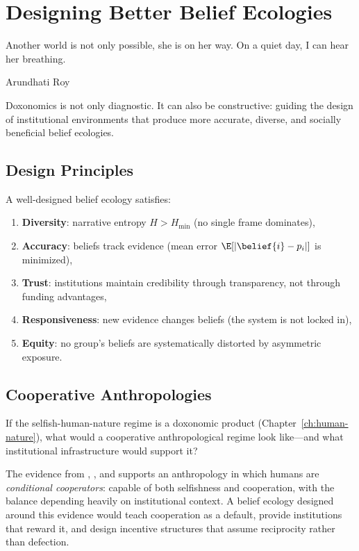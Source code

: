 \chapter{Designing Better Belief Ecologies}
\label{ch:better-belief-ecologies}

\epigraph{Another world is not only possible, she is on her way. On a quiet day, I can hear her breathing.}{Arundhati Roy}

\noindent
Doxonomics is not only diagnostic.
It can also be constructive: guiding the design of institutional environments that produce more accurate, diverse, and socially beneficial belief ecologies.

\section{Design Principles}
\label{sec:ch33-principles}

\begin{principle}
\label{prin:ecology-design}
A well-designed belief ecology satisfies:
\begin{enumerate}[nosep]
  \item \textbf{Diversity}: narrative entropy $H > H_{\min}$ (no single frame dominates),
  \item \textbf{Accuracy}: beliefs track evidence (mean error $\E[|\belief{i} - p_i|]$ is minimized),
  \item \textbf{Trust}: institutions maintain credibility through transparency, not through funding advantages,
  \item \textbf{Responsiveness}: new evidence changes beliefs (the system is not locked in),
  \item \textbf{Equity}: no group's beliefs are systematically distorted by asymmetric exposure.
\end{enumerate}
\end{principle}

\section{Cooperative Anthropologies}
\label{sec:ch33-cooperative}

If the selfish-human-nature regime is a doxonomic product (Chapter~\ref{ch:human-nature}), what would a cooperative anthropological regime look like---and what institutional infrastructure would support it?

The evidence from \textcite{bowles2011}, \textcite{ostrom1990}, and \textcite{nowak2006} supports an anthropology in which humans are \emph{conditional cooperators}: capable of both selfishness and cooperation, with the balance depending heavily on institutional context.
A belief ecology designed around this evidence would teach cooperation as a default, provide institutions that reward it, and design incentive structures that assume reciprocity rather than defection.

